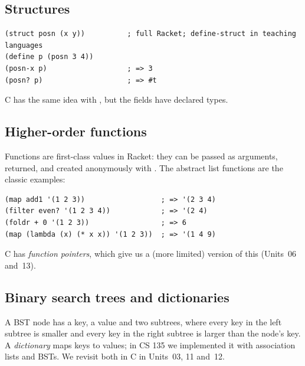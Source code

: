 \subsection{Structures}

\begin{lstlisting}[style=racket]
(struct posn (x y))          ; full Racket; define-struct in teaching languages
(define p (posn 3 4))
(posn-x p)                   ; => 3
(posn? p)                    ; => #t
\end{lstlisting}
C has the same idea with , but the fields have declared types.

\subsection{Higher-order functions}

Functions are first-class values in Racket: they can be passed as arguments, returned, and
created anonymously with . The abstract list functions are the classic examples:
\begin{lstlisting}[style=racket]
(map add1 '(1 2 3))                  ; => '(2 3 4)
(filter even? '(1 2 3 4))            ; => '(2 4)
(foldr + 0 '(1 2 3))                 ; => 6
(map (lambda (x) (* x x)) '(1 2 3))  ; => '(1 4 9)
\end{lstlisting}
C has \emph{function pointers}, which give us a (more limited) version of this
(Units~06 and~13).

\subsection{Binary search trees and dictionaries}

A BST node has a key, a value and two subtrees, where every key in the left subtree is smaller
and every key in the right subtree is larger than the node's key. A \emph{dictionary} maps keys
to values; in CS 135 we implemented it with association lists and BSTs. We revisit both in C
in Units~03, 11 and~12.

\begin{center}
\end{center}

